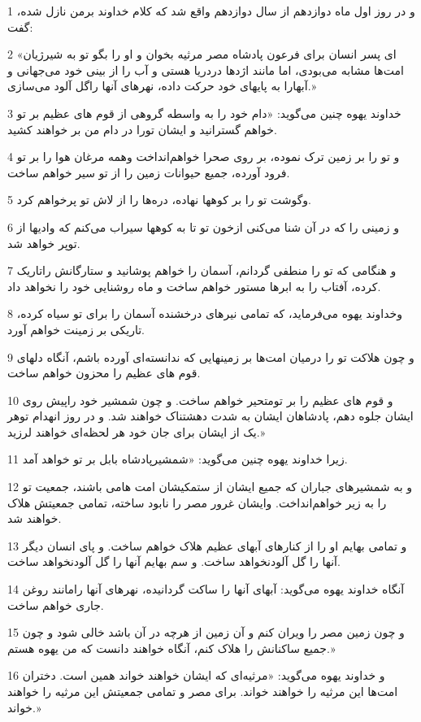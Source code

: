 \par 1 و در روز اول ماه دوازدهم از سال دوازدهم واقع شد که کلام خداوند برمن نازل شده، گفت:
\par 2 «ای پسر انسان برای فرعون پادشاه مصر مرثیه بخوان و او را بگو تو به شیرژیان امت‌ها مشابه می‌بودی، اما مانند اژدها دردریا هستی و آب را از بینی خود می‌جهانی و آبهارا به پایهای خود حرکت داده، نهرهای آنها راگل آلود می‌سازی.»
\par 3 خداوند یهوه چنین می‌گوید: «دام خود را به واسطه گروهی از قوم های عظیم بر تو خواهم گسترانید و ایشان تورا در دام من بر خواهند کشید.
\par 4 و تو را بر زمین ترک نموده، بر روی صحرا خواهم‌انداخت وهمه مرغان هوا را بر تو فرود آورده، جمیع حیوانات زمین را از تو سیر خواهم ساخت.
\par 5 وگوشت تو را بر کوهها نهاده، دره‌ها را از لاش تو پرخواهم کرد.
\par 6 و زمینی را که در آن شنا می‌کنی ازخون تو تا به کوهها سیراب می‌کنم که وادیها از توپر خواهد شد.
\par 7 و هنگامی که تو را منطفی گردانم، آسمان را خواهم پوشانید و ستارگانش راتاریک کرده، آفتاب را به ابرها مستور خواهم ساخت و ماه روشنایی خود را نخواهد داد.
\par 8 وخداوند یهوه می‌فرماید، که تمامی نیرهای درخشنده آسمان را برای تو سیاه کرده، تاریکی بر زمینت خواهم آورد.
\par 9 و چون هلاکت تو را درمیان امت‌ها بر زمینهایی که ندانسته‌ای آورده باشم، آنگاه دلهای قوم های عظیم را محزون خواهم ساخت.
\par 10 و قوم های عظیم را بر تومتحیر خواهم ساخت. و چون شمشیر خود راپیش روی ایشان جلوه دهم، پادشاهان ایشان به شدت دهشتناک خواهند شد. و در روز انهدام توهر یک از ایشان برای جان خود هر لحظه‌ای خواهند لرزید.»
\par 11 زیرا خداوند یهوه چنین می‌گوید: «شمشیرپادشاه بابل بر تو خواهد آمد.
\par 12 و به شمشیرهای جباران که جمیع ایشان از ستمکیشان امت هامی باشند، جمعیت تو را به زیر خواهم‌انداخت. وایشان غرور مصر را نابود ساخته، تمامی جمعیتش هلاک خواهند شد.
\par 13 و تمامی بهایم او را از کنارهای آبهای عظیم هلاک خواهم ساخت. و پای انسان دیگر آنها را گل آلودنخواهد ساخت. و سم بهایم آنها را گل آلودنخواهد ساخت.
\par 14 آنگاه خداوند یهوه می‌گوید: آبهای آنها را ساکت گردانیده، نهرهای آنها رامانند روغن جاری خواهم ساخت.
\par 15 و چون زمین مصر را ویران کنم و آن زمین از هرچه در آن باشد خالی شود و چون جمیع ساکنانش را هلاک کنم، آنگاه خواهند دانست که من یهوه هستم.»
\par 16 و خداوند یهوه می‌گوید: «مرثیه‌ای که ایشان خواهند خواند همین است. دختران امت‌ها این مرثیه را خواهند خواند. برای مصر و تمامی جمعیتش این مرثیه را خواهند خواند.»
